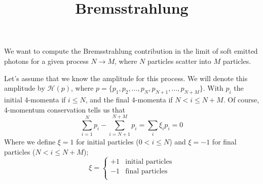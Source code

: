 \documentclass{article}
\title{Bremsstrahlung}
\author{ }
\begin{document}
\maketitle

We want to compute the Bremsstrahlung contribution
in the limit of soft emitted photons for a given process $N \to M$,
where $N$ particles scatter into $M$ particles.

\begin{center}
\end{center}

Let's assume that we know the amplitude for this process.
We will denote this amplitude by $\mathcal{H}(p)$,
where $p = \{p_1, p_2, \ldots, p_N, p_{N+1}, \ldots, p_{N+M}\}$.
With $p_i$ the initial 4-momenta if $i\leq N$, and the final 4-momenta if $N<i\leq N+M$.
Of course, 4-momentum conservation tells us that
\begin{equation*}
	\sum_{i=1}^{N}p_i - \sum_{i=N+1}^{N+M} p_i
	= \sum_i \xi_i p_i
	= 0
\end{equation*}
Where we define $\xi=1$ for initial particles ($0<i\leq N$)
and $\xi=-1$ for final particles ($N<i\leq N+M$);
\begin{equation*}
    \xi
    = \begin{cases}
        +1 & \text{initial particles}\\
        -1 & \text{final particles}\\
    \end{cases}
\end{equation*}
\end{document}
